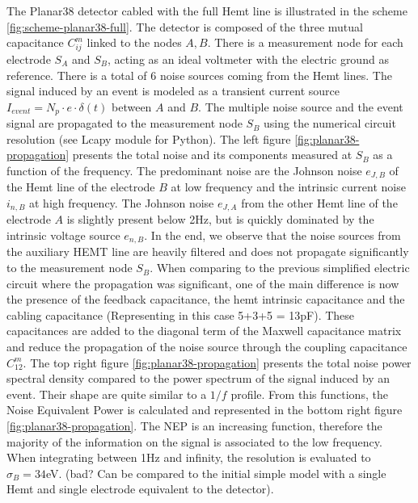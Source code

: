 The Planar38 detector cabled with the full Hemt line is illustrated in the scheme \ref{fig:scheme-planar38-full}. The detector is composed of the three mutual capacitance $C_{ij}^m$ linked to the nodes $A,B$. There is a measurement node for each electrode $S_A$ and $S_B$, acting as an ideal voltmeter with the electric ground as reference. There is a total of 6 noise sources coming from the Hemt lines. The signal induced by an event is modeled as a transient current source $I_{event}=N_p \cdot e \cdot \delta(t)$ between $A$ and $B$. The multiple noise source and the event signal are propagated to the measurement node $S_B$ using the numerical circuit resolution (see Lcapy module for Python).
The left figure \ref{fig:planar38-propagation} presents the total noise and its components measured at $S_B$ as a function of the frequency. The predominant noise are the Johnson noise $e_{J,B}$ of the Hemt line of the electrode $B$ at low frequency and the intrinsic current noise $i_{n,B}$ at high frequency. The Johnson noise $e_{J,A}$ from the other Hemt line of the electrode $A$ is slightly present below 2Hz, but is quickly dominated by the intrinsic voltage source $e_{n,B}$. In the end, we observe that the noise sources from the auxiliary HEMT line are heavily filtered and does not propagate significantly to the measurement node $S_B$. When comparing to the previous simplified electric circuit where the propagation was significant, one of the main difference is now the presence of the feedback capacitance, the hemt intrinsic capacitance and the cabling capacitance (Representing in this case 5+3+5 = 13pF). These capacitances are added to the diagonal term of the Maxwell capacitance matrix and reduce the propagation of the noise source through the coupling capacitance $C_{12}^m$.
The top right figure \ref{fig:planar38-propagation} presents the total noise power spectral density compared to the power spectrum of the signal induced by an event. Their shape are quite similar to a $1/f$ profile. From this functions, the Noise Equivalent Power is calculated and represented in the bottom right figure \ref{fig:planar38-propagation}. The NEP is an increasing function, therefore the majority of the information on the signal is associated to the low frequency. When integrating between 1Hz and infinity, the resolution is evaluated to $\sigma_B=34$eV. (bad? Can be compared to the initial simple model with a single Hemt and single electrode equivalent to the detector).

